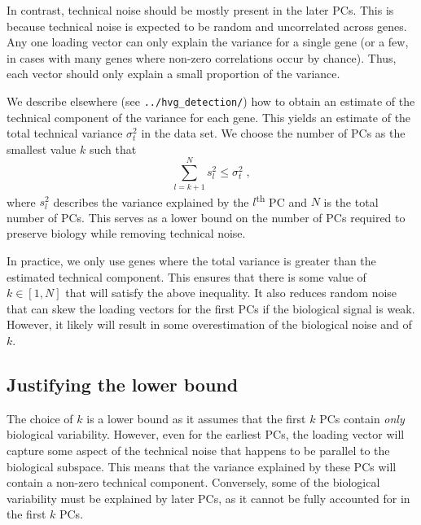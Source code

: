 \documentclass{article}
\begin{document}
In contrast, technical noise should be mostly present in the later PCs.
This is because technical noise is expected to be random and uncorrelated across genes.
Any one loading vector can only explain the variance for a single gene (or a few, in cases with many genes where non-zero correlations occur by chance).
Thus, each vector should only explain a small proportion of the variance.

We describe elsewhere (see \verb!../hvg_detection/!) how to obtain an estimate of the technical component of the variance for each gene.
This yields an estimate of the total technical variance $\sigma^2_t$ in the data set.
We choose the number of PCs as the smallest value $k$ such that 
\[
    \sum_{l=k+1}^N s^2_l  \le \sigma^2_t \;,
\]
where $s^2_l$ describes the variance explained by the $l$\textsuperscript{th} PC and $N$ is the total number of PCs.
This serves as a lower bound on the number of PCs required to preserve biology while removing technical noise.


In practice, we only use genes where the total variance is greater than the estimated technical component.
This ensures that there is some value of $k \in [1, N]$ that will satisfy the above inequality.
It also reduces random noise that can skew the loading vectors for the first PCs if the biological signal is weak.
However, it likely will result in some overestimation of the biological noise and of $k$.

\subsection{Justifying the lower bound} 
The choice of $k$ is a lower bound as it assumes that the first $k$ PCs contain \textit{only} biological variability.
However, even for the earliest PCs, the loading vector will capture some aspect of the technical noise that happens to be parallel to the biological subspace.
This means that the variance explained by these PCs will contain a non-zero technical component.
Conversely, some of the biological variability must be explained by later PCs, as it cannot be fully accounted for in the first $k$ PCs.
\end{document}
